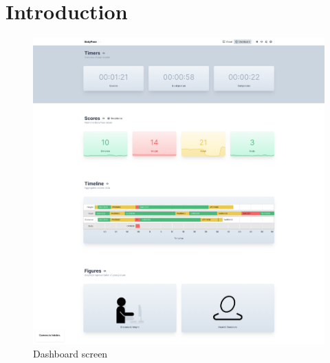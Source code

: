 \section{Introduction} %
\label{introduction}

\begin{figure}[htpb]
\centering
   \includegraphics[width=\linewidth]{media/demo.png}
  \caption{Dashboard screen}
  \label{fig:demo-app-screen}
\end{figure}

